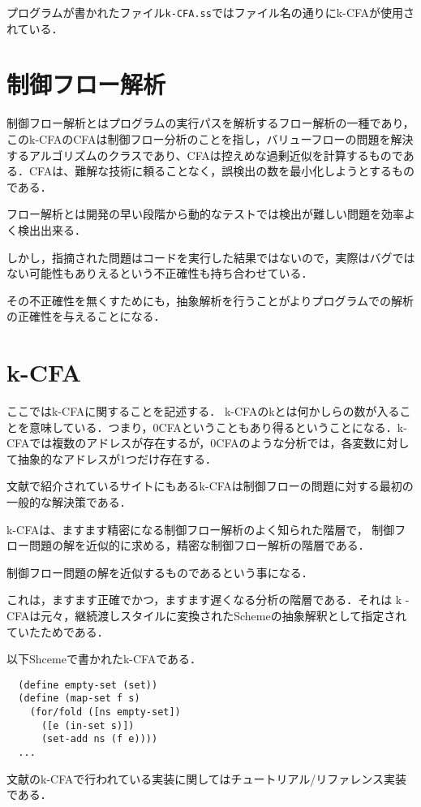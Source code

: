 \documentclass[twocolumn]{jsarticle}
\begin{document}
プログラムが書かれたファイル\verb|k-CFA.ss|ではファイル名の通りにk-CFAが使用されている．
 
\section{制御フロー解析}
制御フロー解析とはプログラムの実行パスを解析するフロー解析の一種であり，このk-CFAのCFAは制御フロー分析のことを指し，バリューフローの問題を解決するアルゴリズムのクラスであり、CFAは控えめな過剰近似を計算するものである．CFAは、難解な技術に頼ることなく，誤検出の数を最小化しようとするものである．

フロー解析とは開発の早い段階から動的なテストでは検出が難しい問題を効率よく検出出来る．
 
しかし，指摘された問題はコードを実行した結果ではないので，実際はバグではない可能性もありえるという不正確性も持ち合わせている．

その不正確性を無くすためにも，抽象解析を行うことがよりプログラムでの解析の正確性を与えることになる．


\section{k-CFA}
ここではk-CFAに関することを記述する．
k-CFAのkとは何かしらの数が入ることを意味している．つまり，0CFAということもあり得るということになる．k-CFAでは複数のアドレスが存在するが，0CFAのような分析では，各変数に対して抽象的なアドレスが1つだけ存在する．

文献\cite{reason2}で紹介されているサイトにもあるk-CFAは制御フローの問題に対する最初の一般的な解決策である．
 
k-CFAは、ますます精密になる制御フロー解析のよく知られた階層で，
制御フロー問題の解を近似的に求める，精密な制御フロー解析の階層である．

制御フロー問題の解を近似するものであるという事になる．
 
これは，ますます正確でかつ，ますます遅くなる分析の階層である．それは k -CFAは元々，継続渡しスタイルに変換されたSchemeの抽象解釈として指定されていたためである．

以下Shcemeで書かれたk-CFAである．
\setlength{\baselineskip}{18pt}
\begin{verbatim}
  (define empty-set (set))
  (define (map-set f s)
    (for/fold ([ns empty-set])  
      ([e (in-set s)])
      (set-add ns (f e))))
  ...
\end{verbatim}

文献\cite{reason2}のk-CFAで行われている実装に関してはチュートリアル/リファレンス実装である．
 
\end{document}
